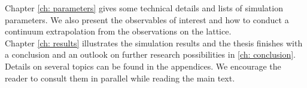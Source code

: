 %
Chapter \ref{ch: parameters} gives some technical details and lists of simulation parameters. We also present the observables of interest and how to conduct a continuum extrapolation from the observations on the lattice.\\
%
Chapter \ref{ch: results} illustrates the simulation results and the thesis finishes with a conclusion and an outlook on further research possibilities in \autoref{ch: conclusion}.\\
%
Details on several topics can be found in the appendices. We encourage the reader to consult them in parallel while reading the main text.
